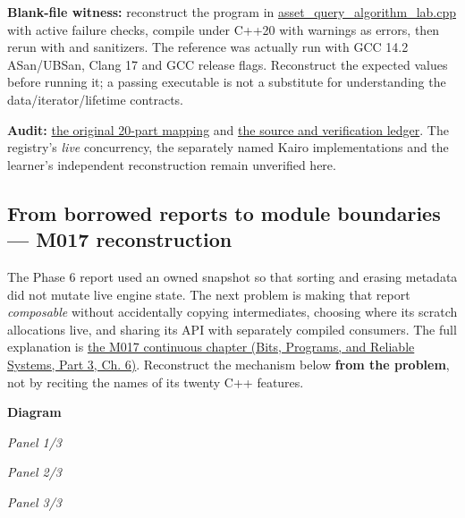 \textbf{Blank-file witness:} reconstruct the program in \hyperref[source-file-c479bd493444d093f6c34898]{asset\_query\_algorithm\_lab.cpp} with active failure checks, compile under C++20 with warnings as errors, then rerun with  and sanitizers. The reference was actually run with GCC 14.2 ASan/UBSan, Clang 17 and GCC release flags. Reconstruct the expected values before running it; a passing executable is not a substitute for understanding the data/iterator/lifetime contracts.

\textbf{Audit:} \hyperref[appendix-fd090d982a15-m016-parts-251270-the-asset-registry-becomes-a-query-and-transformation-pipeline]{the original 20-part mapping} and \hyperref[appendix-a103e7846d21-phase-6-additive-reconstruction-m016-parts-251270]{the source and verification ledger}. The registry's \emph{live} concurrency, the separately named Kairo implementations and the learner's independent reconstruction remain unverified here.

\subsection{From borrowed reports to module boundaries --- M017 reconstruction}\label{appendix-960160274237-from-borrowed-reports-to-module-boundaries-m017-reconstruction}

\hypertarget{appendix-960160274237-from-borrowed-reports-to-module-boundaries-m017-reconstruction}{}

The Phase 6 report used an owned snapshot so that sorting and erasing metadata did not mutate live engine state. The next problem is making that report \emph{composable} without accidentally copying intermediates, choosing where its scratch allocations live, and sharing its API with separately compiled consumers. The full explanation is \href{../01-Bits-Programs-and-Reliable-Systems-P03/main.pdf\#01-foundations-i-ch006-from-copying-every-asset-report-to-a-lazy-allocatable-separately-compiled-query-service}{the M017 continuous chapter (Bits, Programs, and Reliable Systems, Part 3, Ch. 6)}. Reconstruct the mechanism below \textbf{from the problem}, not by reciting the names of its twenty C++ features.

\par\medskip\noindent\textbf{Diagram}\par
\par\noindent\textit{Panel 1/3}\par{}\par
\par\noindent\textit{Panel 2/3}\par{}\par
\par\noindent\textit{Panel 3/3}\par{}\par

